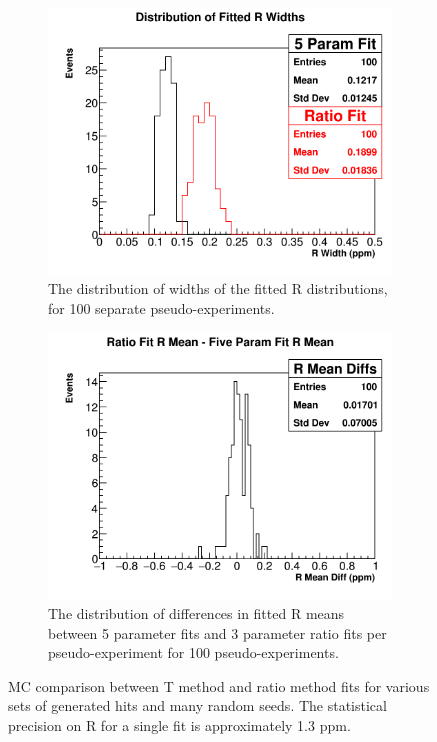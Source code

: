 \begin{figure}[h]
\begin{subfigure}[t]{0.45\textwidth}
		\label{Subfig:MeanDist}
	    \end{subfigure}%
	    \vspace{4mm}
	    \begin{subfigure}[t]{0.45\textwidth}
		    \centering
			\includegraphics[width=\textwidth]{width_canvas}
		    \caption{The distribution of widths of the fitted R distributions, for 100 separate pseudo-experiments.}
		\label{Subfig:WidthDist}
	    \end{subfigure}
	   	\hspace{4mm}
	    \begin{subfigure}[t]{0.45\textwidth}
		    \centering
			\includegraphics[width=\textwidth]{diff_canvas}
		    \caption{The distribution of differences in fitted R means between 5 parameter fits and 3 parameter ratio fits per pseudo-experiment for 100 pseudo-experiments.}
		\label{Subfig:DiffDist}
	    \end{subfigure}%
	\caption[TMethodComparison]{MC comparison between T method and ratio method fits for various sets of generated hits and many random seeds. The statistical precision on R for a single fit is approximately 1.3 ppm.}
	\label{fig:TMethodComparison}
	\end{figure}


